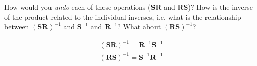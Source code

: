 How would you \emph{undo} each of these operations ($\boldsymbol{SR}$ and $\boldsymbol{RS}$)? How is the inverse of the product related to the individual inverses, i.e. what is the relationship between $\left(\boldsymbol{SR}\right)^{-1}$ and $\boldsymbol{S}^{-1}$ and $\boldsymbol{R}^{-1}$? What about $\left(\boldsymbol{RS}\right)^{-1}$?

\begin{solution}
    \begin{align*}
        \left(\boldsymbol{SR}\right)^{-1} = \boldsymbol{R}^{-1}\boldsymbol{S}^{-1} \\
        \left(\boldsymbol{RS}\right)^{-1} = \boldsymbol{S}^{-1}\boldsymbol{R}^{-1}
    \end{align*}
\end{solution}